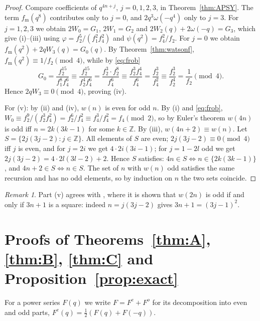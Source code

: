 \documentclass[11pt]{amsart}
\theoremstyle{definition}
\theoremstyle{remark}
\newtheorem{remark}[theorem]{Remark}
\numberwithin{equation}{section}
\newcommand{\Z}{\mathbb{Z}}
\begin{document}
\begin{proof}
Compare coefficients of $q^{4n+j}$, $j=0,1,2,3$, in Theorem~\ref{thm:APSY}. The term $f_{\mathrm m}(q^8)$ contributes only to $j=0$, and $2q^3\omega(-q^4)$ only to $j=3$. For $j=1,2,3$ we obtain $2W_0=G_1$, $2W_1=G_2$ and $2W_2(q)+2\omega(-q)=G_3$, which give (i)--(iii) using $\varphi=f_2^5/(f_1^2f_4^2)$ and $\psi(q^2)=f_4^2/f_2$. For $j=0$ we obtain $f_{\mathrm m}(q^2)+2qW_3(q)=G_0(q)$. By Theorem~\ref{thm:watsonf}, $f_{\mathrm m}(q^2)\equiv 1/f_2\pmod 4$, while by \eqref{eq:frob}
\[
G_0=\frac{f_2^{15}}{f_1^{8}f_4^{6}}\equiv\frac{f_2^{15}}{f_2^{4}f_4^{6}}=\frac{f_2^{3}\cdot f_2^8}{f_4^6}\equiv\frac{f_2^3f_4^4}{f_4^6}=\frac{f_2^3}{f_4^2}\equiv\frac{f_2^3}{f_2^4}=\frac1{f_2}\pmod 4 .
\]
Hence $2qW_3\equiv0\pmod 4$, proving (iv).

For (v): by (ii) and (iv), $w(n)$ is even for odd $n$. By (i) and \eqref{eq:frob}, $W_0\equiv f_2^9/(f_2^3f_4^2)=f_2^6/f_4^2\equiv f_4^3/f_4^2=f_4\pmod 2$, so by Euler's theorem $w(4n)$ is odd iff $n=2k(3k-1)$ for some $k\in\Z$. By (iii), $w(4n+2)\equiv w(n)$. Let $S=\{2j(3j-2):j\in\Z\}$. All elements of $S$ are even; $2j(3j-2)\equiv0\pmod4$ iff $j$ is even, and for $j=2i$ we get $4\cdot 2i(3i-1)$; for $j=1-2l$ odd we get $2j(3j-2)=4\cdot 2l(3l-2)+2$. Hence $S$ satisfies: $4n\in S\iff n\in\{2k(3k-1)\}$, and $4n+2\in S\iff n\in S$. The set of $n$ with $w(n)$ odd satisfies the same recursion and has no odd elements, so by induction on $n$ the two sets coincide.
\end{proof}

\begin{remark}
Part (v) agrees with \cite[Thm.~4.4]{Wang}, where it is shown that $w(2n)$ is odd if and only if $3n+1$ is a square: indeed $n=j(3j-2)$ gives $3n+1=(3j-1)^2$.
\end{remark}

\section{Proofs of Theorems~\ref{thm:A}, \ref{thm:B}, \ref{thm:C} and Proposition~\ref{prop:exact}}\label{sec:ABC}

For a power series $F(q)$ we write $F=F^{e}+F^{o}$ for its decomposition into even and odd parts, $F^{e}(q)=\frac12(F(q)+F(-q))$.
\end{document}
